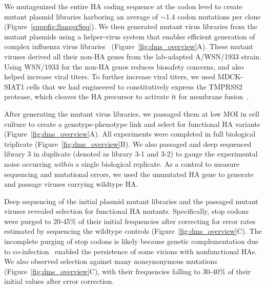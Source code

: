 \documentclass[9pt,twocolumn,twoside]{pnas-new}
\begin{document}
We mutagenized the entire HA coding sequence at the codon level to create mutant plasmid libraries harboring an average of $\sim$1.4 codon mutations per clone (Figure~\ref{suppfig:SangerSeq}).
We then generated mutant virus libraries from the mutant plasmids using a helper-virus system that enables efficient generation of complex influenza virus libraries~\cite{doud2016accurate} (Figure~\ref{fig:dms_overview}A).
These mutant viruses derived all their non-HA genes from the lab-adapted A/WSN/1933 strain.
Using WSN/1933 for the non-HA genes reduces biosafety concerns, and also helped increase viral titers.
To further increase viral titers, we used MDCK-SIAT1 cells that we had engineered to constitutively express the TMPRSS2 protease, which cleaves the HA precursor to activate it for membrane fusion~\cite{bottcher2006proteolytic, bottcher2010cleavage}.

After generating the mutant virus libraries, we passaged them at low MOI in cell culture to create a genotype-phenotype link and select for functional HA variants (Figure~\ref{fig:dms_overview}A).
All experiments were completed in full biological triplicate (Figure~\ref{fig:dms_overview}B). 
We also passaged and deep sequenced library 3 in duplicate (denoted as library 3-1 and 3-2) to gauge the experimental noise occurring \textit{within} a single biological replicate.
As a control to measure sequencing and mutational errors, we used the unmutated HA gene to generate and passage viruses carrying wildtype HA.

Deep sequencing of the initial plasmid mutant libraries and the passaged mutant viruses revealed selection for functional HA mutants.
Specifically, stop codons were purged to 20-45\% of their initial frequencies after correcting for error rates estimated by sequencing the wildtype controls (Figure~\ref{fig:dms_overview}C).
The incomplete purging of stop codons is likely because genetic complementation due to co-infection~\cite{marshall2013influenza} enabled the persistence of some virions with nonfunctional HAs. 
We also observed selection against many nonsynonymous mutations (Figure~\ref{fig:dms_overview}C), with their frequencies falling to 30-40\% of their initial values after error correction.
\end{document}
